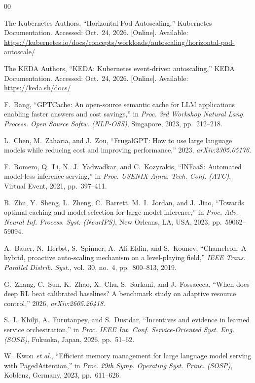\documentclass[conference,a4paper]{IEEEtran}
\begin{document}
\begin{thebibliography}{00}

The Kubernetes Authors, ``Horizontal Pod Autoscaling,''
Kubernetes Documentation. Accessed: Oct.~24, 2026. [Online]. Available:
\url{https://kubernetes.io/docs/concepts/workloads/autoscaling/horizontal-pod-autoscale/}

The KEDA Authors, ``KEDA: Kubernetes event-driven autoscaling,'' KEDA
Documentation. Accessed: Oct.~24, 2026. [Online]. Available:
\url{https://keda.sh/docs/}

F.~Bang, ``GPTCache: An open-source semantic cache for LLM applications
enabling faster answers and cost savings,'' in \textit{Proc. 3rd Workshop
Natural Lang. Process. Open Source Softw. (NLP-OSS)}, Singapore, 2023,
pp.~212--218.

L.~Chen, M.~Zaharia, and J.~Zou, ``FrugalGPT: How to use large language
models while reducing cost and improving performance,'' 2023,
\textit{arXiv:2305.05176}.

F.~Romero, Q.~Li, N.~J.~Yadwadkar, and C.~Kozyrakis, ``INFaaS: Automated
model-less inference serving,'' in \textit{Proc. USENIX Annu. Tech. Conf.
(ATC)}, Virtual Event, 2021, pp.~397--411.

B.~Zhu, Y.~Sheng, L.~Zheng, C.~Barrett, M.~I.~Jordan, and J.~Jiao,
``Towards optimal caching and model selection for large model inference,''
in \textit{Proc. Adv. Neural Inf. Process. Syst. (NeurIPS)}, New Orleans,
LA, USA, 2023, pp.~59062--59094.

A.~Bauer, N.~Herbst, S.~Spinner, A.~Ali-Eldin, and S.~Kounev, ``Chameleon:
A hybrid, proactive auto-scaling mechanism on a level-playing field,''
\textit{IEEE Trans. Parallel Distrib. Syst.}, vol.~30, no.~4,
pp.~800--813, 2019.

G.~Zhang, C.~Sun, K.~Zhao, X.~Chu, S.~Sarkani, and J.~Fossaceca, ``When
does deep RL beat calibrated baselines? A benchmark study on adaptive
resource control,'' 2026, \textit{arXiv:2605.26418}.

S.~I.~Khilji, A.~Furutanpey, and S.~Dustdar, ``Incentives and evidence in
learned service orchestration,'' in \textit{Proc. IEEE Int. Conf.
Service-Oriented Syst. Eng. (SOSE)}, Fukuoka, Japan, 2026, pp.~51--62.

W.~Kwon \textit{et al.}, ``Efficient memory management for large language
model serving with PagedAttention,'' in \textit{Proc. 29th Symp. Operating
Syst. Princ. (SOSP)}, Koblenz, Germany, 2023, pp.~611--626.


\end{thebibliography}
\end{document}
